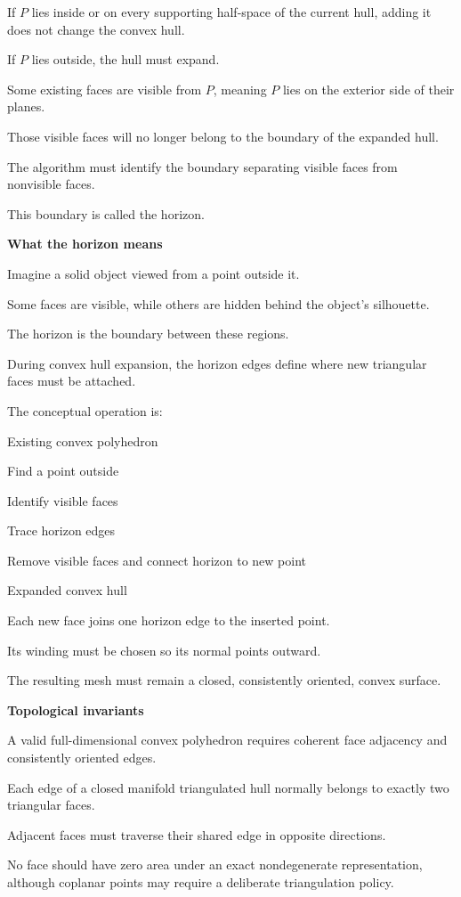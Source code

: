 If \(P\) lies inside or on every supporting half-space of the current hull, adding it does not change the convex hull.

If \(P\) lies outside, the hull must expand.

Some existing faces are visible from \(P\), meaning \(P\) lies on the exterior side of their planes.

Those visible faces will no longer belong to the boundary of the expanded hull.

The algorithm must identify the boundary separating visible faces from nonvisible faces.

This boundary is called the horizon.

\textbf{What the horizon means}

Imagine a solid object viewed from a point outside it.

Some faces are visible, while others are hidden behind the object's silhouette.

The horizon is the boundary between these regions.

During convex hull expansion, the horizon edges define where new triangular faces must be attached.

The conceptual operation is:

Existing convex polyhedron

Find a point outside

Identify visible faces

Trace horizon edges

Remove visible faces and connect horizon to new point

Expanded convex hull

Each new face joins one horizon edge to the inserted point.

Its winding must be chosen so its normal points outward.

The resulting mesh must remain a closed, consistently oriented, convex surface.

\textbf{Topological invariants}

A valid full-dimensional convex polyhedron requires coherent face adjacency and consistently oriented edges.

Each edge of a closed manifold triangulated hull normally belongs to exactly two triangular faces.

Adjacent faces must traverse their shared edge in opposite directions.

No face should have zero area under an exact nondegenerate representation, although coplanar points may require a deliberate triangulation policy.


